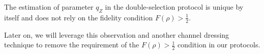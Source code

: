     \begin{observation}
        \label{lem3}
        The estimation of parameter $q_Z$ in the double-selection protocol is unique by itself and does not rely on the fidelity condition \(F(\rho)> \frac 1 2\).
    \end{observation}
    Later on, we will leverage this observation and another channel dressing technique to remove the requirement of the \(F(\rho)> \frac 1 2\) condition in our protocols.



